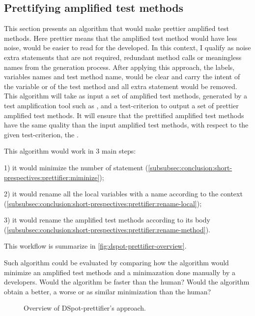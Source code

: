 \subsection{Prettifying amplified test methods}
\label{subsec:conclusion:short-prespectives:prettifier}

This section presents an algorithm that would make prettier amplified test methods.
Here prettier means that the amplified test method would have less noise, \ie would be easier to read for the developed.
In this context, I qualify as noise extra statements that are not required, redundant method calls or meaningless names from the generation process.
After applying this approach, the labels, \ie variables names and test method name, would be clear and carry the intent of the variable or of the test method and all extra statement would be removed.
This algorithm will take as input a set of amplified test methods, generated by a test amplification tool such as \dspot, and a test-criterion to output a set of prettier amplified test methods.
It will ensure that the prettified amplified test methods have the same quality than the input amplified test methods, with respect to the given test-criterion, \eg the \ms.

This algorithm would work in 3 main steps:

1) it would minimize the number of statement (\autoref{subsubsec:conclusion:short-prespectives:prettifier:miminize});

2) it would rename all the local variables with a name according to the context (\autoref{subsubsec:conclusion:short-prespectives:prettifier:rename-local});

3) it would rename the amplified test methods according to its body (\autoref{subsubsec:conclusion:short-prespectives:prettifier:rename-method}).

This workflow is summarize in \autoref{fig:dspot-prettifier-overview}.

Such algorithm could be evaluated by comparing how the algorithm would minimize an amplified test methods and a minimazation done manually by a developers.
Would the algorithm be faster than the human?
Would the algorithm obtain a better, a worse or as similar minimization than the human?

\begin{figure}
	\label{fig:dspot-prettifier-overview}
	\caption{Overview of DSpot-prettifier's approach.}
\end{figure}

